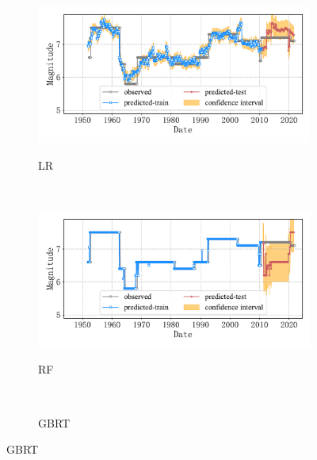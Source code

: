\begin{figure}[!htbp]
\begin{subfigure}[b]{0.45\textwidth}
      \caption{LR}
      \vspace{-0.2cm}
      \includegraphics[width=\textwidth]{Img/chap5_seism/split85/seism_lr_minyear_1932_maxyear_2021_spanlat_2_spanlon_4_timewindow_120_nextmonth_120_minmag_3.0_split_ratio_0.85_blocks1.pdf}
      \vspace{-1cm}
      \label{fig:seism_lr_minyear_1932_maxyear_2021_spanlat_2_spanlon_4_timewindow_120_nextmonth_120_minmag_3.0_split_ratio_0.85_blocks1}
  \end{subfigure}
  ~
  \begin{subfigure}[b]{0.45\textwidth}
    \caption{RF}
    \vspace{-0.2cm}
    \includegraphics[width=\textwidth]{Img/chap5_seism/split85/seism_rf_minyear_1932_maxyear_2021_spanlat_2_spanlon_4_timewindow_120_nextmonth_120_minmag_3.0_split_ratio_0.85_blocks1.pdf}
    \vspace{-1cm}
    \label{fig:seism_rf_minyear_1932_maxyear_2021_spanlat_2_spanlon_4_timewindow_120_nextmonth_120_minmag_3.0_split_ratio_0.85_blocks1}
  \end{subfigure}
  \\
  \begin{subfigure}[b]{0.45\textwidth}
    \caption{GBRT}
    \vspace{-0.2cm}

\end{subfigure}
\end{figure}

